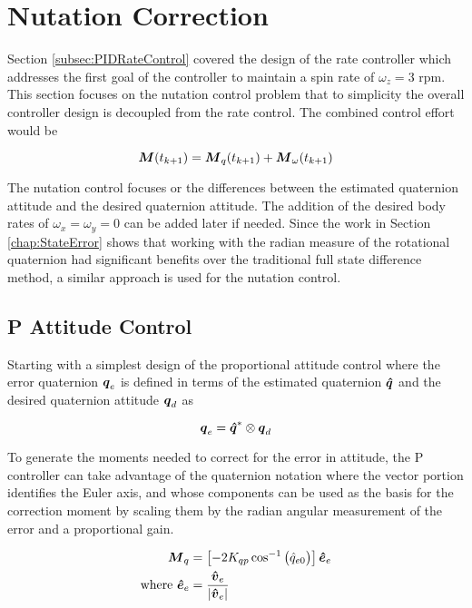 \section{Nutation Correction}
\label{sec:NutationCorrection}

Section \ref{subsec:PIDRateControl} covered the design of the rate controller which addresses the first goal of the controller to maintain a spin rate of $\omega_z = 3$ rpm.  This section focuses on the nutation control problem that to simplicity the overall controller design is decoupled from the rate control.  The combined control effort would be

\begin{equation}
    \boldsymbol{M}(t_{k+1}) = \boldsymbol{M}_{q}(t_{k+1}) + \boldsymbol{M}_{\omega}(t_{k+1})
\end{equation}

The nutation control focuses or the differences between the estimated quaternion attitude and the desired quaternion attitude.  The addition of the desired body rates of $\omega_x = \omega_y = 0$ can be added later if needed.  Since the work in Section \ref{chap:StateError} shows that working with the radian measure of the rotational quaternion had significant benefits over the traditional full state difference method, a similar approach is used for the nutation control.

\subsection{P Attitude Control}
\label{subsec:PAttitudeControl}

Starting with a simplest design of the proportional attitude control where the error quaternion $\boldsymbol{q}_e$ is defined in terms of the estimated quaternion $\boldsymbol{\hat{q}}$ and the desired quaternion attitude $\boldsymbol{q}_d$ as

\begin{equation}
  \boldsymbol{q}_e = \boldsymbol{\hat{q}}^* \otimes \boldsymbol{q}_d
\end{equation}

To generate the moments needed to correct for the error in attitude, the P controller can take advantage of the quaternion notation where the vector portion identifies the Euler axis, and whose components can be used as the basis for the correction moment by scaling them by the radian angular measurement of the error and a proportional gain.

\begin{subequations}
  \begin{align}
    \boldsymbol{M}_{q} &= \left[-2 K_{qp} \cos^{-1} \big(\hat{q}_{e0} \big) \right] \boldsymbol{\hat{e}}_e \\
    \text{where } \boldsymbol{\hat{e}}_e &= \frac{\boldsymbol{\hat{v}}_e}{|\boldsymbol{\hat{v}}_e|}
  \end{align}
  \label{eqn:PAttitudeControl}
\end{subequations}


